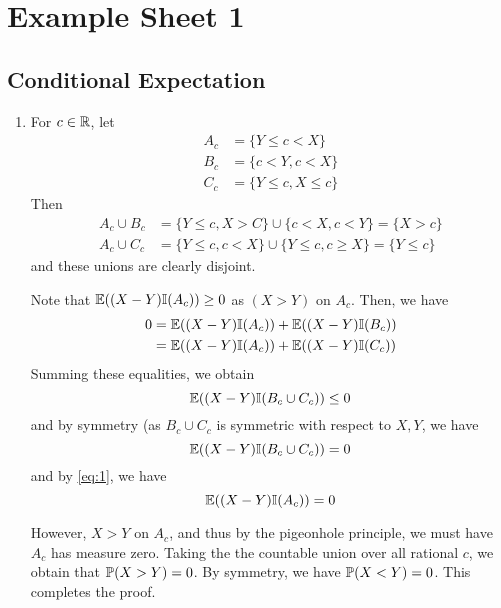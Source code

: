 \chapter{Example Sheet 1}
\label{cha:example-sheet-1}

\section{Conditional Expectation}
\label{sec:cond-expect}

\begin{enumerate}
\item For $c \in \mathbb{R}$, let
  \begin{align*}
    A_{c} &= \{ Y \leq c < X \} \\
    B_{c} &= \{ c < Y, c < X \} \\
    C_{c} &= \{ Y \leq c, X \leq c \}
  \end{align*}
  Then
  \begin{align*}
    A_{c} \cup B_{c} &= \{ Y \leq c, X > C \} \cup \{ c < X, c < Y \} =
    \{ X > c \} \\
    A_{c} \cup C_{c} &= \{ Y \leq c, c < X \} \cup \{ Y \leq c, c \geq
    X \} = \{ Y \leq c \}
  \end{align*} and these unions are clearly disjoint.

  Note that $\E{(X-Y)\I{A_{c}}} \geq 0$ as $(X > Y)$ on $A_{c}$. Then,
  we have
  \begin{align}
    \label{eq:1}
    0 &= \E{(X - Y)\I{A_{c}}} + \E{(X-Y)\I{B_{c}}} \\
    &= \E{(X-Y)\I{A_{c}}} + \E{(X-Y)\I{C_{c}}}
  \end{align}
  Summing these equalities, we obtain
  \begin{equation}
    \label{eq:2}
    \E{(X-Y)\I{B_{c} \cup C_{c}}} \leq 0
  \end{equation} and by symmetry (as $B_{c} \cup C_{c}$ is symmetric
  with respect to $X, Y$, we have
  \begin{equation}
    \label{eq:3}
    \E{(X-Y)\I{B_{c} \cup C_{c}}} = 0
  \end{equation} and by \eqref{eq:1}, we have
  \begin{equation}
    \label{eq:4}
    \E{(X-Y)\I{A_{c}}} = 0
  \end{equation}

  However, $X > Y$ on $A_{c}$, and thus by the pigeonhole principle,
  we must have $A_{c}$ has measure zero. Taking the the countable
  union over all rational $c$, we obtain that $\Prob{X > Y} = 0$.  By
  symmetry, we have $\Prob{X < Y} = 0$.  This completes the proof.


\end{enumerate}
